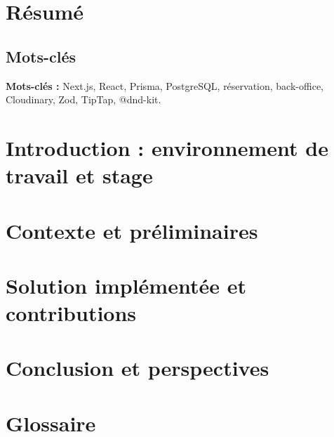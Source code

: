 \documentclass[a4paper,11pt,openany]{book}
\begin{document}
\newpage
\thispagestyle{empty}

\chapter*{Résumé}


\section*{Mots-clés}
\noindent \textbf{Mots-clés :} Next.js, React, Prisma, PostgreSQL, réservation, back-office, Cloudinary, Zod, TipTap, @dnd-kit.

\newpage
\thispagestyle{empty}

\tableofcontents

\newpage
{} %

\chapter{Introduction : environnement de travail et stage}\label{ch:Introduction}


\chapter{Contexte et préliminaires}\label{ch:background}


\chapter{Solution implémentée et contributions}\label{ch:solution}


\chapter{Conclusion et perspectives}\label{ch:conclusion}


\clearpage
{}
{}



\chapter*{Glossaire}

\end{document}
